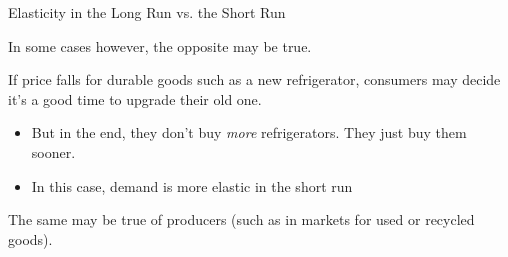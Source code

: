 \documentclass[12pt,t]{beamer}
\begin{document}
\begin{frame}{Elasticity in the Long Run vs. the Short Run}
  
  In some cases however, the opposite may be true.
  
  \bigskip
  If price falls for durable goods such as a new refrigerator, consumers may decide it's a good time to upgrade their old one.
  \begin{itemize}
    \item But in the end, they don't buy \textit{more} refrigerators. They just buy them sooner.
    
    \item In this case, demand is more elastic in the short run
  \end{itemize}

  
  \bigskip
  The same may be true of producers (such as in markets for used or recycled goods).
\end{frame}
\end{document}
